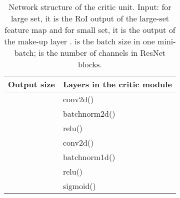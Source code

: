 \documentclass{article} \usepackage{iclr2019_conference,times}
\begin{document}
\begin{table*}[h]
	\centering
	\begin{tabular}{   l |  l}
		Output size & Layers in the critic module \\ \toprule
		 & conv2d() \\
		 & batchnorm2d() \\
		 & relu() \\
		 & conv2d() \\
		 & batchnorm1d() \\
		 & relu() \\
		 & sigmoid() \\
	\end{tabular}
	\vspace{-.2cm}
	\caption{
{
		Network structure of the critic unit.
Input: for large set, it is the RoI output of the large-set feature map  and for small set, it is the output of the make-up layer .
		 is the batch size in one mini-batch;  is the number of channels in ResNet blocks.}
}\label{tab:critic_layer}
\end{table*}
\end{document}
